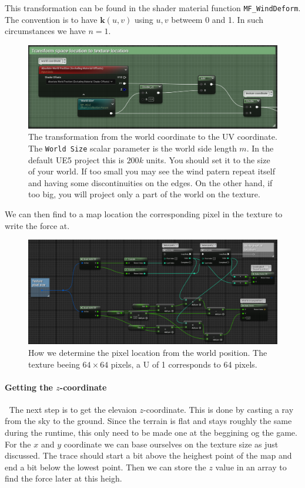 \documentclass[../main.tex]{subfile}
\begin{document}
This transformation can be found in the shader material function \texttt{MF\_WindDeform}. The convention is to have $\bm{k}(u,v)$ using $u,v$ betweem 0 and 1. 
In such circumstances we have $n=1$.
\begin{figure}[H]
    \centering
    \includegraphics[width=1\textwidth]{Ressources/RealSpaceToUV.png}
    \caption{The transformation from the world coordinate to the UV coordinate. The \texttt{World Size} scalar parameter is the world side length $m$.
    In the default UE5 project this is $200k$ units. You should set it to the size of your world. If too small you may see the wind patern repeat itself
    and having some discontinuities on the edges. On the other hand, if too big, you will project only a part of the world on the texture.}
\end{figure}

We can then find to a map location the corresponding pixel in the texture to write the force at. 
\begin{figure}[H]
    \centering
    \includegraphics[width=1\textwidth]{Ressources/WritePixelAtLoca.png}
    \caption{How we determine the pixel location from the world position. The texture beeing $64\times64$ pixels, a U of 1 corresponds to 64 pixels.}                                                                       
\end{figure}

\paragraph{Getting the $z$-coordinate} $~$ The next step is to get the elevaion $z$-coordinate. This is done by casting a ray from the sky to the ground. Since the 
terrain is flat and stays roughly the same during the runtime, this only need to be made one at the beggining og the game. For the $x$ and $y$ coordinate we can base ourselves on the texture size as just discussed.
The trace should start a bit above the heighest point of the map and end a bit below the lowest point. Then we can store the $z$ value in an array to find
the force later at this heigh.\\
\end{document}
